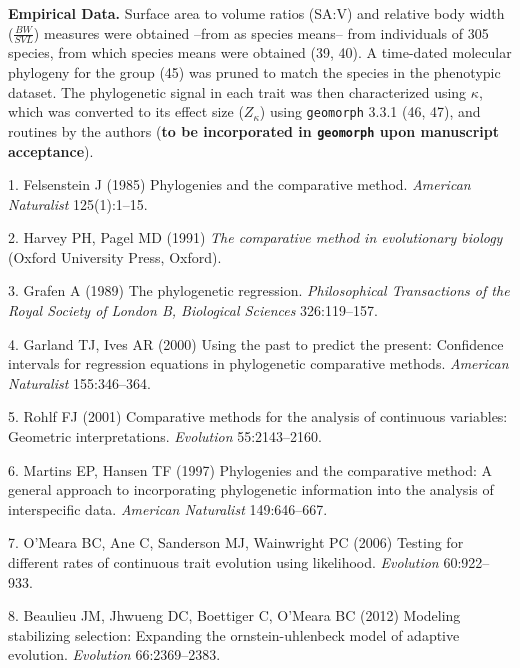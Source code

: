 \documentclass[9pt,twocolumn,twoside,lineno]{pnas-new}
\begin{document}
\textbf{Empirical Data.} Surface area to volume ratios (SA:V) and
relative body width (\(\frac{BW}{SVL}\)) measures were obtained --from
as species means-- from individuals of 305 species, from which species
means were obtained (39, 40). A time-dated molecular phylogeny for the
group (45) was pruned to match the species in the phenotypic dataset.
The phylogenetic signal in each trait was then characterized using
\(\kappa\), which was converted to its effect size (\(Z_\kappa\)) using
\texttt{geomorph} 3.3.1 (46, 47), and routines by the authors
(\textbf{to be incorporated in \texttt{geomorph} upon manuscript
acceptance}).

\showmatmethods
\showacknow
\pnasbreak

\hypertarget{refs}{}
\leavevmode\hypertarget{ref-Felsenstein1985}{}%
1. Felsenstein J (1985) Phylogenies and the comparative method.
\emph{American Naturalist} 125(1):1--15.

\leavevmode\hypertarget{ref-HarveyPagel1991}{}%
2. Harvey PH, Pagel MD (1991) \emph{The comparative method in
evolutionary biology} (Oxford University Press, Oxford).

\leavevmode\hypertarget{ref-Grafen1989}{}%
3. Grafen A (1989) The phylogenetic regression. \emph{Philosophical
Transactions of the Royal Society of London B, Biological Sciences}
326:119--157.

\leavevmode\hypertarget{ref-GarlandIves2000}{}%
4. Garland TJ, Ives AR (2000) Using the past to predict the present:
Confidence intervals for regression equations in phylogenetic
comparative methods. \emph{American Naturalist} 155:346--364.

\leavevmode\hypertarget{ref-Rohlf2001}{}%
5. Rohlf FJ (2001) Comparative methods for the analysis of continuous
variables: Geometric interpretations. \emph{Evolution} 55:2143--2160.

\leavevmode\hypertarget{ref-MartinsHansen1997}{}%
6. Martins EP, Hansen TF (1997) Phylogenies and the comparative method:
A general approach to incorporating phylogenetic information into the
analysis of interspecific data. \emph{American Naturalist} 149:646--667.

\leavevmode\hypertarget{ref-OMeara_et_al2006}{}%
7. O'Meara BC, Ane C, Sanderson MJ, Wainwright PC (2006) Testing for
different rates of continuous trait evolution using likelihood.
\emph{Evolution} 60:922--933.

\leavevmode\hypertarget{ref-Beaulieu_et_al2012}{}%
8. Beaulieu JM, Jhwueng DC, Boettiger C, O'Meara BC (2012) Modeling
stabilizing selection: Expanding the ornstein-uhlenbeck model of
adaptive evolution. \emph{Evolution} 66:2369--2383.
\end{document}
